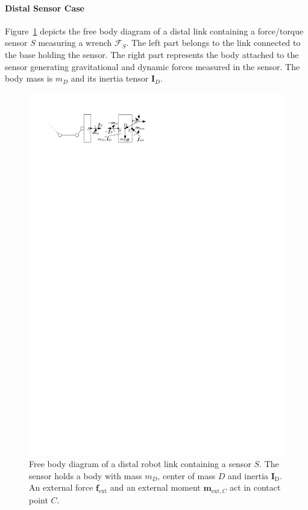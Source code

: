 \paragraph{Distal Sensor Case}
Figure~\ref{fig:fkb} depicts the free body diagram of a distal link containing a force/torque sensor $S$ measuring a wrench $\bm{\mathcal{F}}_S$.
The left part belongs to the link connected to the base holding the sensor.
The right part represents the body attached to the sensor generating gravitational and dynamic forces measured in the sensor.
The body mass is $m_D$ and its inertia tensor $\bm{I}_{D}$.
%
\begin{figure}
\begin{center}
\includegraphics{figures/freikoerperbild}
\end{center}
\caption{Free body diagram of a distal robot link containing a sensor $S$.
The sensor holds a body with mass $m_D$, center of mass $D$ and inertia $\bm{I}_\mathrm{D}$.
An external force $\bm{f}_\mathrm{ext}$ and an external moment $\bm{m}_{\mathrm{ext},C}$ act in contact point $C$.}\vspace*{-0.7cm}
\label{fig:fkb}
\end{figure}
